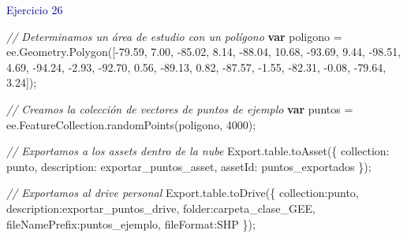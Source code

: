 \documentclass[
  12pt,
  letterpaper,
  twoside]{book}
\newenvironment{Shaded}{\begin{snugshade}}{\end{snugshade}}
\newcommand{\AttributeTok}[1]{\textcolor[rgb]{0.48,0.12,0.64}{#1}}
\newcommand{\CommentTok}[1]{\textcolor[rgb]{0.24,0.58,0.00}{\textit{#1}}}
\newcommand{\ControlFlowTok}[1]{\textcolor[rgb]{0.00,0.00,0.00}{\textbf{#1}}}
\newcommand{\DataTypeTok}[1]{\textcolor[rgb]{0.00,0.00,0.00}{#1}}
\newcommand{\DecValTok}[1]{\textcolor[rgb]{0.28,0.53,0.93}{#1}}
\newcommand{\FloatTok}[1]{\textcolor[rgb]{0.28,0.53,0.93}{#1}}
\newcommand{\FunctionTok}[1]{\textcolor[rgb]{0.48,0.12,0.64}{#1}}
\newcommand{\KeywordTok}[1]{\textcolor[rgb]{0.48,0.12,0.64}{#1}}
\newcommand{\NormalTok}[1]{#1}
\newcommand{\OperatorTok}[1]{\textcolor[rgb]{0.00,0.00,0.00}{#1}}
\newcommand{\StringTok}[1]{\textcolor[rgb]{0.87,0.29,0.22}{#1}}
\begin{document}
\textcolor{darkblue}{Ejercicio 26}

\begin{Shaded}
\begin{Highlighting}[]
\CommentTok{// Determinamos un área de estudio con un polígono}
\ControlFlowTok{var}\NormalTok{ poligono }\OperatorTok{=} \KeywordTok{ee}\OperatorTok{.}\AttributeTok{Geometry}\OperatorTok{.}\FunctionTok{Polygon}\NormalTok{([}\OperatorTok{{-}}\FloatTok{79.59}\OperatorTok{,} \FloatTok{7.00}\OperatorTok{,}
          \OperatorTok{{-}}\FloatTok{85.02}\OperatorTok{,} \FloatTok{8.14}\OperatorTok{,}
          \OperatorTok{{-}}\FloatTok{88.04}\OperatorTok{,} \FloatTok{10.68}\OperatorTok{,}
          \OperatorTok{{-}}\FloatTok{93.69}\OperatorTok{,} \FloatTok{9.44}\OperatorTok{,}
          \OperatorTok{{-}}\FloatTok{98.51}\OperatorTok{,} \FloatTok{4.69}\OperatorTok{,}
          \OperatorTok{{-}}\FloatTok{94.24}\OperatorTok{,} \OperatorTok{{-}}\FloatTok{2.93}\OperatorTok{,}
          \OperatorTok{{-}}\FloatTok{92.70}\OperatorTok{,} \FloatTok{0.56}\OperatorTok{,}
          \OperatorTok{{-}}\FloatTok{89.13}\OperatorTok{,} \FloatTok{0.82}\OperatorTok{,}
          \OperatorTok{{-}}\FloatTok{87.57}\OperatorTok{,} \OperatorTok{{-}}\FloatTok{1.55}\OperatorTok{,}
          \OperatorTok{{-}}\FloatTok{82.31}\OperatorTok{,} \OperatorTok{{-}}\FloatTok{0.08}\OperatorTok{,}
          \OperatorTok{{-}}\FloatTok{79.64}\OperatorTok{,} \FloatTok{3.24}\NormalTok{])}\OperatorTok{;}

\CommentTok{// Creamos la colección de vectores de puntos de ejemplo}
\ControlFlowTok{var}\NormalTok{ puntos }\OperatorTok{=} \KeywordTok{ee}\OperatorTok{.}\AttributeTok{FeatureCollection}\OperatorTok{.}\FunctionTok{randomPoints}\NormalTok{(poligono}\OperatorTok{,} \DecValTok{4000}\NormalTok{)}\OperatorTok{;}

\CommentTok{// Exportamos a los assets dentro de la nube}
\NormalTok{Export}\OperatorTok{.}\AttributeTok{table}\OperatorTok{.}\FunctionTok{toAsset}\NormalTok{(\{}
  \DataTypeTok{collection}\OperatorTok{:}\NormalTok{ punto}\OperatorTok{,}
  \DataTypeTok{description}\OperatorTok{:} \StringTok{\textquotesingle{}exportar\_puntos\_asset\textquotesingle{}}\OperatorTok{,}
  \DataTypeTok{assetId}\OperatorTok{:} \StringTok{\textquotesingle{}puntos\_exportados\textquotesingle{}}
\NormalTok{\})}\OperatorTok{;}

\CommentTok{// Exportamos al drive personal}
\NormalTok{Export}\OperatorTok{.}\AttributeTok{table}\OperatorTok{.}\FunctionTok{toDrive}\NormalTok{(\{}
  \DataTypeTok{collection}\OperatorTok{:}\NormalTok{punto}\OperatorTok{,} 
  \DataTypeTok{description}\OperatorTok{:}\StringTok{\textquotesingle{}exportar\_puntos\_drive\textquotesingle{}}\OperatorTok{,}
  \DataTypeTok{folder}\OperatorTok{:}\StringTok{\textquotesingle{}carpeta\_clase\_GEE\textquotesingle{}}\OperatorTok{,}
  \DataTypeTok{fileNamePrefix}\OperatorTok{:}\StringTok{\textquotesingle{}puntos\_ejemplo\textquotesingle{}}\OperatorTok{,}
  \DataTypeTok{fileFormat}\OperatorTok{:}\StringTok{\textquotesingle{}SHP\textquotesingle{}}
\NormalTok{\})}\OperatorTok{;}
\end{Highlighting}
\end{Shaded}
\end{document}

